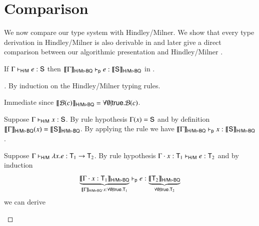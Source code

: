 \documentclass{report}
\begin{document}
  \section{Comparison}
  We now compare our type system with Hindley/Milner. We show that
  every type derivation in Hindley/Milner is also derivable in \BQsa
   and later give a direct comparison between our algorithmic presentation \BQ
  and Hindley/Milner .
  
  \begin{thm}
    If $\Gamma\entailsml e:\type{S}$ then $\mltobq{\Gamma}\entailsp e:\mltobq{\type{S}}$ in \BQsa.
  \end{thm}
  \begin{proof}[]
    By induction on the Hindley/Milner typing rules.
    \begin{indcase}{\mlbase}
      Immediate since $\mltobq{\Base(c)}=\forall\emptyset|\true.\Base(c)$.
    \end{indcase}
    \begin{indcase}{\mlvar}
      Suppose $\Gamma\entailsml x:\type{S}$. By rule hypothesis $\Gamma(x)=\type{S}$
      and by definition $\mltobq{\Gamma}(x)=\mltobq{\type{S}}$. By applying the
      \sdvar rule we have $\mltobq{\Gamma}\entailsp x:\mltobq{\type{S}}$.
    \end{indcase}
    \begin{indcase}{\mlabs}
      Suppose $\Gamma\entailsml \lambda x.e:\type{T}_1\fun\type{T}_2$. By rule hypothesis
      $\Gamma\cdot x:\type{T}_1\entailsml e:\type{T}_2$ and by induction
      \begin{displaymath}
        \underbrace{\mltobq{\Gamma\cdot x:\type{T}_1}}_{\mltobq{\Gamma}\cdot x:\forall\emptyset|\true.\type{T}_1}\entailsp
        e:\underbrace{\mltobq{\type{T}_2}}_{\forall\emptyset|\true.\type{T}_2}
      \end{displaymath}
      we can derive
      \begin{mathpar}

\end{mathpar}
\end{indcase}
\end{proof}
\end{document}
